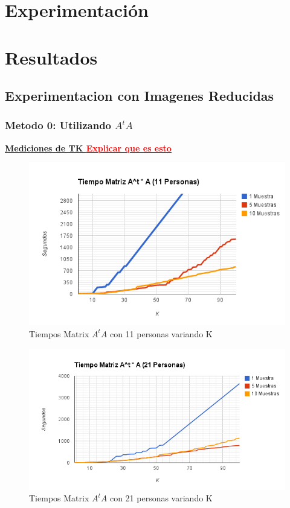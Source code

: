 \section{Experimentación}


\section{Resultados}
\subsection{Experimentacion con Imagenes Reducidas}
\subsubsection{Metodo 0: Utilizando $A^tA$}

\underline{\textbf{Mediciones de TK \textcolor{red}{Explicar que es esto}}}

\begin{figure}[H]
\includegraphics[width=1\textwidth]{img/image1.png}
     \caption{Tiempos Matrix $A^tA$ con 11 personas variando K}
     \label{fig:figura1}
\end{figure}

\begin{figure}[H]
\includegraphics[width=1\textwidth]{img/image2.png}
     \caption{Tiempos Matrix $A^tA$ con 21 personas variando K}
     \label{fig:figura1}
\end{figure}

